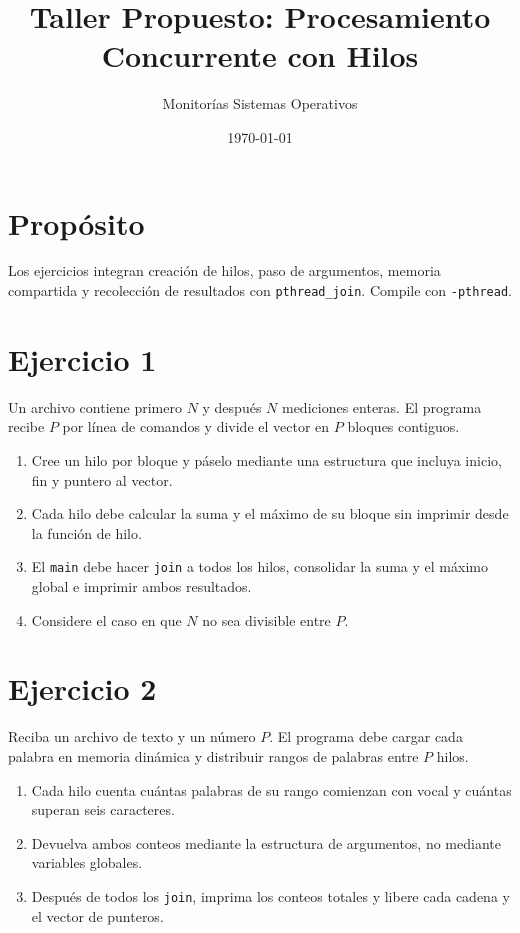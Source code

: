 \documentclass[12pt,a4paper]{article}
\title{\textbf{Taller Propuesto: Procesamiento Concurrente con Hilos}}
\author{Monitorías Sistemas Operativos}
\date{\today}
\begin{document}
\maketitle

\section*{Propósito}
Los ejercicios integran creación de hilos, paso de argumentos, memoria compartida y recolección de resultados con \texttt{pthread\_join}. Compile con \texttt{-pthread}.

\section*{Ejercicio 1}
Un archivo contiene primero $N$ y después $N$ mediciones enteras. El programa recibe $P$ por línea de comandos y divide el vector en $P$ bloques contiguos.
\begin{enumerate}
    \item Cree un hilo por bloque y páselo mediante una estructura que incluya inicio, fin y puntero al vector.
    \item Cada hilo debe calcular la suma y el máximo de su bloque sin imprimir desde la función de hilo.
    \item El \texttt{main} debe hacer \texttt{join} a todos los hilos, consolidar la suma y el máximo global e imprimir ambos resultados.
    \item Considere el caso en que $N$ no sea divisible entre $P$.
\end{enumerate}

\section*{Ejercicio 2}
Reciba un archivo de texto y un número $P$. El programa debe cargar cada palabra en memoria dinámica y distribuir rangos de palabras entre $P$ hilos.
\begin{enumerate}
    \item Cada hilo cuenta cuántas palabras de su rango comienzan con vocal y cuántas superan seis caracteres.
    \item Devuelva ambos conteos mediante la estructura de argumentos, no mediante variables globales.
    \item Después de todos los \texttt{join}, imprima los conteos totales y libere cada cadena y el vector de punteros.
\end{enumerate}
\end{document}
